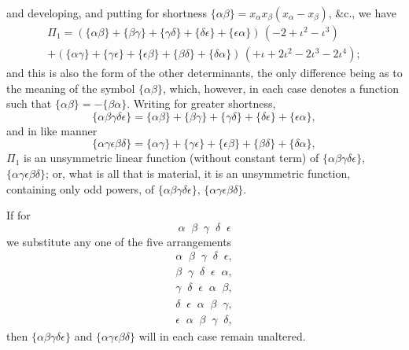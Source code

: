 \documentclass[11pt,a4paper]{article}
\begin{document}
and developing, and putting for shortness $\{\alpha\beta\}=x_\alpha x_\beta (x_\alpha-x_\beta)$, \&c., we have
\begin{multline*}
\Pi_1=(\{\alpha\beta\}+\{\beta\gamma\}+\{\gamma\delta\}+\{\delta\epsilon\}+\{\epsilon\alpha\})\,(-2+\iota^2-\iota^3)\\
+(\{\alpha\gamma\}+\{\gamma\epsilon\}+\{\epsilon\beta\}+\{\beta\delta\}+\{\delta\alpha\})\,(+\iota+2\iota^2-2\iota^3-2\iota^4);
\end{multline*}
and this is also the form of the other determinants, the only difference being as to the meaning of the symbol $\{\alpha\beta\}$, which, however, in each case denotes a function such that $\{\alpha\beta\}=-\{\beta\alpha\}$. Writing for greater shortness,
\[
\{\alpha\beta\gamma\delta\epsilon\}=\{\alpha\beta\}+\{\beta\gamma\}+\{\gamma\delta\}+\{\delta\epsilon\}+\{\epsilon\alpha\},
\]
and in like manner
\[
\{\alpha\gamma\epsilon\beta\delta\}=\{\alpha\gamma\}+\{\gamma\epsilon\}+\{\epsilon\beta\}+\{\beta\delta\}+\{\delta\alpha\},
\]
$\Pi_1$ is an unsymmetric linear function (without constant term) of $\{\alpha\beta\gamma\delta\epsilon\}$, $\{\alpha\gamma\epsilon\beta\delta\}$; or, what is all that is material, it is an unsymmetric function, containing only odd powers, of $\{\alpha\beta\gamma\delta\epsilon\}$, $\{\alpha\gamma\epsilon\beta\delta\}$.

If for
\[
\alpha\;\;\beta\;\;\gamma\;\;\delta\;\;\epsilon
\]
we substitute any one of the five arrangements
\begin{align*}
\alpha\;\;\beta\;\;\gamma\;\;\delta\;\;\epsilon,\\
\beta\;\;\gamma\;\;\delta\;\;\epsilon\;\;\alpha,\\
\gamma\;\;\delta\;\;\epsilon\;\;\alpha\;\;\beta,\\
\delta\;\;\epsilon\;\;\alpha\;\;\beta\;\;\gamma,\\
\epsilon\;\;\alpha\;\;\beta\;\;\gamma\;\;\delta,
\end{align*}
then $\{\alpha\beta\gamma\delta\epsilon\}$ and $\{\alpha\gamma\epsilon\beta\delta\}$ will in each case remain unaltered.
\end{document}
